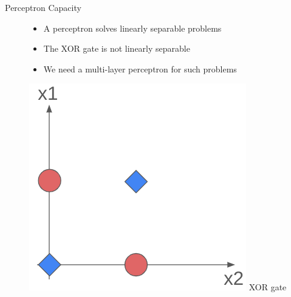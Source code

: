 \documentclass[serif, aspectratio=169]{beamer}
\begin{document}
\begin{frame}[t]{Perceptron Capacity}
\begin{figure}[h]
        \centering
        \begin{minipage}{0.45\textwidth}
            \begin{itemize}
                \item A perceptron solves linearly separable problems
                \item The XOR gate is not linearly separable
                \item We need a multi-layer perceptron for such problems
            \end{itemize}
        \end{minipage}
        \hfill
        \begin{minipage}{0.45\textwidth}
            \centering
            \includegraphics[width=\textwidth]{pic/1/xor.png}
            {\scriptsize XOR gate}
        \end{minipage}
    \end{figure}
\end{frame}
\end{document}

